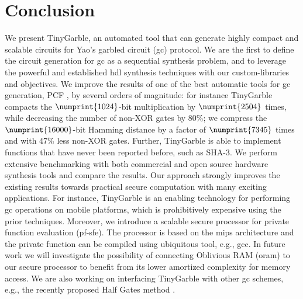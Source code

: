 \chapter{Conclusion}
We present TinyGarble, an automated tool that can generate highly compact and scalable circuits for Yao's garbled circuit (\acrshort{gc}) protocol.
We are the first to define the circuit generation for \acrshort{gc} as a sequential synthesis problem, and to leverage the powerful and established \acrshort{hdl} synthesis techniques with our custom-libraries and objectives.
We improve the results of one of the best automatic tools for \acrshort{gc} generation, PCF \cite{kreuter2013pcf}, by several orders of magnitude: for instance TinyGarble compacts the $\numprint{1024}$-bit multiplication by $\numprint{2504}$ times, while decreasing the number of non-XOR gates by 80\%; we compress the $\numprint{16000}$-bit Hamming distance by a factor of $\numprint{7345}$ times and with 47\% less non-XOR gates.
Further, TinyGarble is able to implement functions that have never been reported before, such as SHA-3.
We perform extensive benchmarking with both commercial and open source hardware synthesis tools and compare the results.
Our approach strongly improves the existing results towards practical secure computation with many exciting applications.
For instance, TinyGarble is an enabling technology for performing \acrshort{gc} operations on mobile platforms, which is prohibitively expensive using the prior techniques.
Moreover, we introduce a scalable secure processor for private function evaluation (\acrshort{pf-sfe}).
The processor is based on the \acrshort{mips} architecture and the private function can be compiled using ubiquitous tool, e.g., gcc.
In future work we will investigate the possibility of connecting Oblivious RAM (\acrshort{oram}) to our secure processor to benefit from its lower amortized complexity for memory access.
We are also working on interfacing TinyGarble with other \acrshort{gc} schemes, e.g., the recently proposed Half Gates method \cite{zahur2015two}.
